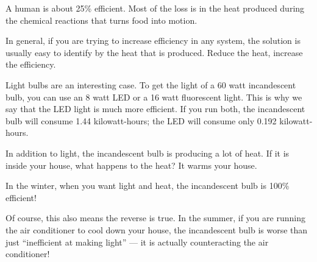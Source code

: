 A human is about 25\% efficient. Most of the loss is in the heat produced
during the chemical reactions that turns food into motion.

In general, if you are trying to increase efficiency in any system,
the solution is usually easy to identify by the heat that is produced. Reduce the heat, increase the efficiency.

Light bulbs are an interesting case. To get the light of a 60 watt
incandescent bulb, you can use an 8 watt LED or a 16 watt fluorescent
light. This is why we say that the LED light is much more efficient. If you
run both, the incandescent bulb will consume 1.44 kilowatt-hours; the
LED will consume only 0.192 kilowatt-hours.

In addition to light, the incandescent bulb is producing a lot of heat. If it
is inside your house, what happens to the heat? It warms your house.

In the winter, when you want light and heat, the incandescent bulb is
100\% efficient!

Of course, this also means the reverse is true. In the summer, if you are running the air conditioner to cool down your house, the
incandescent bulb is worse than just ``inefficient at making light'' ---
it is actually counteracting the air conditioner!
